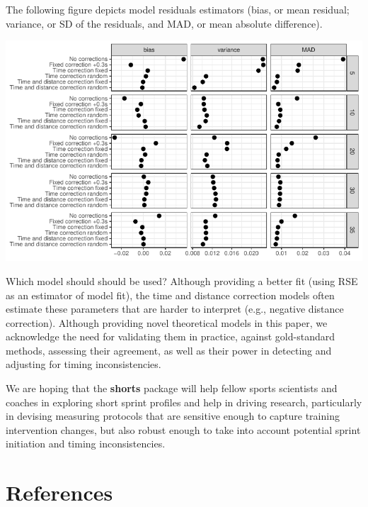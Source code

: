 \documentclass[fleqn,10pt,lineno]{wlpeerj} %
\begin{document}
The following figure depicts model residuals estimators (bias, or mean residual; variance, or SD of the residuals, and MAD, or mean absolute difference).

\begin{center}\includegraphics[width=0.9\linewidth]{paper_files/figure-latex/unnamed-chunk-60-1} \end{center}

Which model should should be used? Although providing a better fit (using RSE as an estimator of model fit), the time and distance correction models often estimate these parameters that are harder to interpret (e.g., negative distance correction). Although providing novel theoretical models in this paper, we acknowledge the need for validating them in practice, against gold-standard methods, assessing their agreement, as well as their power in detecting and adjusting for timing inconsistencies.

We are hoping that the \textbf{shorts} package will help fellow sports scientists and coaches in exploring short sprint profiles and help in driving research, particularly in devising measuring protocols that are sensitive enough to capture training intervention changes, but also robust enough to take into account potential sprint initiation and timing inconsistencies.

\hypertarget{references}{%
\section*{References}\label{references}}
\end{document}
